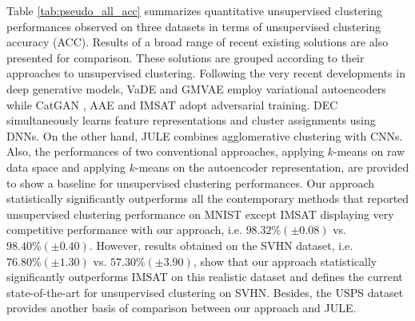 \documentclass{article} \usepackage{iclr2018_conference,times}
\begin{document}
Table \ref{tab:pseudo_all_acc} summarizes quantitative unsupervised clustering performances observed on three datasets in terms of unsupervised clustering accuracy (ACC). Results of a broad range of recent existing solutions are also presented for comparison. These solutions are grouped according to their approaches to unsupervised clustering. Following the very recent developments in deep generative models, VaDE \citep{JiangZTTZ17} and GMVAE \citep{DilokthanakulMG16} employ variational autoencoders while CatGAN \citep{Springenberg15}, AAE \citep{MakhzaniSJG15} and IMSAT \citep{HuMTMS17} adopt adversarial training. DEC \citep{XieGF16} simultaneously learns feature representations and cluster assignments using DNNs. On the other hand, JULE \citep{YangPB16} combines agglomerative clustering with CNNs. Also, the performances of two conventional approaches, applying $k$-means on raw data space and applying $k$-means on the autoencoder representation, are provided to show a baseline for unsupervised clustering performances. Our approach statistically significantly outperforms all the contemporary methods that reported unsupervised clustering performance on MNIST except IMSAT \citep{HuMTMS17} displaying very competitive performance with our approach, i.e. $98.32\%(\pm 0.08)$ vs. $98.40\%(\pm 0.40)$. However, results obtained on the SVHN dataset, i.e. $76.80\%(\pm 1.30)$ vs. $57.30\%(\pm 3.90)$, show that our approach statistically significantly outperforms IMSAT on this realistic dataset and defines the current state-of-the-art for unsupervised clustering on SVHN. Besides, the USPS dataset provides another basis of comparison between our approach and JULE. 
\end{document}
